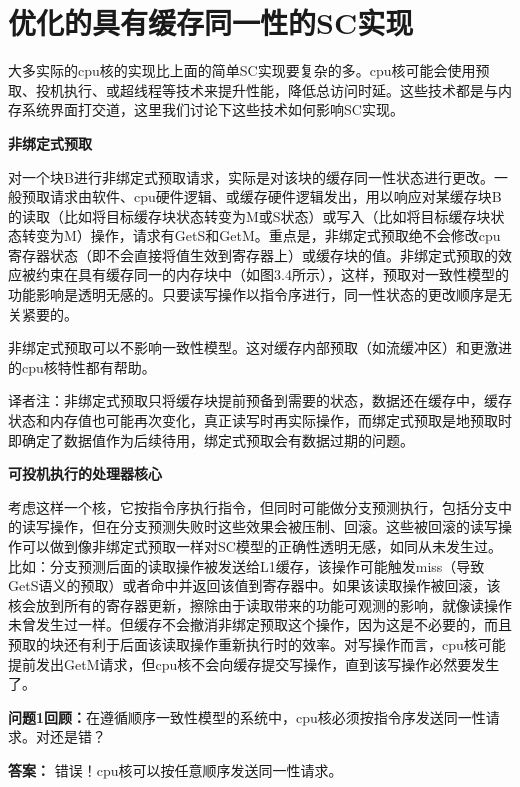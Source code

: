 \documentclass[UTF-8]{ctexrep}
\begin{document}
\section{优化的具有缓存同一性的SC实现}
大多实际的cpu核的实现比上面的简单SC实现要复杂的多。cpu核可能会使用预取、投机执行、或超线程等技术来提升性能，降低总访问时延。这些技术都是与内存系统界面打交道，这里我们讨论下这些技术如何影响SC实现。
\par \textbf{非绑定式预取}
\par 对一个块B进行非绑定式预取请求，实际是对该块的缓存同一性状态进行更改。一般预取请求由软件、cpu硬件逻辑、或缓存硬件逻辑发出，用以响应对某缓存块B的读取（比如将目标缓存块状态转变为M或S状态）或写入（比如将目标缓存块状态转变为M）操作，请求有GetS和GetM。重点是，非绑定式预取绝不会修改cpu寄存器状态（即不会直接将值生效到寄存器上）或缓存块的值。非绑定式预取的效应被约束在具有缓存同一的内存块中（如图3.4所示），这样，预取对一致性模型的功能影响是透明无感的。只要读写操作以指令序进行，同一性状态的更改顺序是无关紧要的。
\par 非绑定式预取可以不影响一致性模型。这对缓存内部预取（如流缓冲区）和更激进的cpu核特性都有帮助。
\par 译者注：非绑定式预取只将缓存块提前预备到需要的状态，数据还在缓存中，缓存状态和内存值也可能再次变化，真正读写时再实际操作，而绑定式预取是地预取时即确定了数据值作为后续待用，绑定式预取会有数据过期的问题。
\par \textbf{可投机执行的处理器核心}
\par 考虑这样一个核，它按指令序执行指令，但同时可能做分支预测执行，包括分支中的读写操作，但在分支预测失败时这些效果会被压制、回滚。这些被回滚的读写操作可以做到像非绑定式预取一样对SC模型的正确性透明无感，如同从未发生过。比如：分支预测后面的读取操作被发送给L1缓存，该操作可能触发miss（导致GetS语义的预取）或者命中并返回该值到寄存器中。如果该读取操作被回滚，该核会放到所有的寄存器更新，擦除由于读取带来的功能可观测的影响，就像读操作未曾发生过一样。但缓存不会撤消非绑定预取这个操作，因为这是不必要的，而且预取的块还有利于后面该读取操作重新执行时的效率。对写操作而言，cpu核可能提前发出GetM请求，但cpu核不会向缓存提交写操作，直到该写操作必然要发生了。
\begin{sidebarbox}
\par \textbf {问题1回顾：}在遵循顺序一致性模型的系统中，cpu核必须按指令序发送同一性请求。对还是错？
\par \textbf{答案：} 错误！cpu核可以按任意顺序发送同一性请求。
\end{sidebarbox}





 












\par















 
\end{document}
